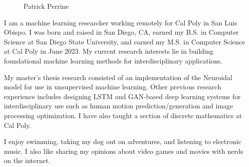 \documentclass{article}
\begin{document}
\begin{figure}
    \centering
    \vspace{-6mm}\Large{Patrick Perrine}\vspace{5mm}
    {%
	   \setlength{\fboxsep}{0pt}%
	   \setlength{\fboxrule}{3pt}%
	 }%
\end{figure} \hfill

I am a machine learning researcher working remotely for Cal Poly in San Luis Obispo. I was born and raised in San Diego, CA, earned my B.S. in Computer Science at San Diego State University, and earned my M.S. in Computer Science at Cal Poly in June 2023. My current research interests lie in building foundational machine learning methods for interdisciplinary applications. 

My master’s thesis research consisted of an implementation of the Neuroidal model for use in unsupervised machine learning. Other previous research experience includes designing LSTM and GAN-based deep learning systems for interdisciplinary use such as human motion prediction/generation and image processing optimization. I have also taught a section of discrete mathematics at Cal Poly.

I enjoy swimming, taking my dog out on adventures, and listening to electronic music. I also like sharing my opinions about video games and movies with nerds on the internet.

\let\thefootnote\relax{}
\end{document}
